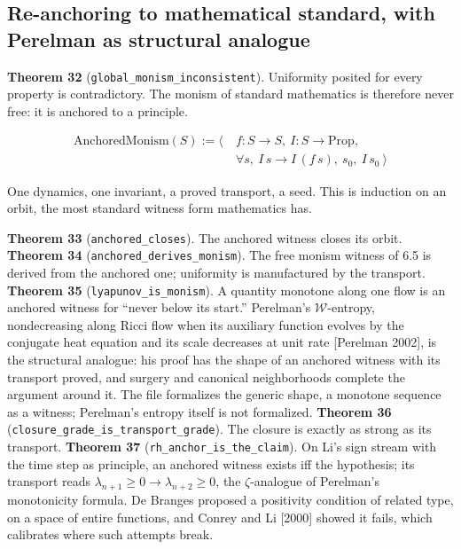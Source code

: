 \documentclass[10pt,twocolumn]{article}
\begin{document}
\hypertarget{re-anchoring-to-mathematical-standard-with-perelman-as-structural-analogue}{%
\subsection{Re-anchoring to mathematical standard, with Perelman as
structural
analogue}\label{re-anchoring-to-mathematical-standard-with-perelman-as-structural-analogue}}

\textbf{Theorem 32} (\texttt{global\_monism\_inconsistent}). Uniformity
posited for every property is contradictory. The monism of standard
mathematics is therefore never free: it is anchored to a principle.

\[\begin{aligned}\mathrm{AnchoredMonism}(S) := \big\langle\ &f : S \to S,\ I : S \to \mathrm{Prop},\\ &\forall s,\ I\,s \to I\,(f\,s),\ s_0,\ I\,s_0 \ \big\rangle\end{aligned}\]

One dynamics, one invariant, a proved transport, a seed. This is
induction on an orbit, the most standard witness form mathematics has.

\textbf{Theorem 33} (\texttt{anchored\_closes}). The anchored witness
closes its orbit. \textbf{Theorem 34}
(\texttt{anchored\_derives\_monism}). The free monism witness of 6.5 is
derived from the anchored one; uniformity is manufactured by the
transport. \textbf{Theorem 35} (\texttt{lyapunov\_is\_monism}). A
quantity monotone along one flow is an anchored witness for ``never
below its start.'' Perelman's \(\mathcal W\)-entropy, nondecreasing
along Ricci flow when its auxiliary function evolves by the conjugate
heat equation and its scale decreases at unit rate {[}Perelman 2002{]},
is the structural analogue: his proof has the shape of an anchored
witness with its transport proved, and surgery and canonical
neighborhoods complete the argument around it. The file formalizes the
generic shape, a monotone sequence as a witness; Perelman's entropy
itself is not formalized. \textbf{Theorem 36}
(\texttt{closure\_grade\_is\_transport\_grade}). The closure is exactly
as strong as its transport. \textbf{Theorem 37}
(\texttt{rh\_anchor\_is\_the\_claim}). On Li's sign stream with the time
step as principle, an anchored witness exists iff the hypothesis; its
transport reads \(\lambda_{n+1} \geq 0 \to \lambda_{n+2} \geq 0\), the
\(\zeta\)-analogue of Perelman's monotonicity formula. De Branges
proposed a positivity condition of related type, on a space of entire
functions, and Conrey and Li {[}2000{]} showed it fails, which
calibrates where such attempts break.
\end{document}
